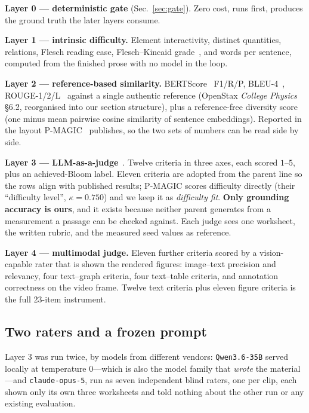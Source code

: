 \documentclass[conference]{IEEEtran}
\begin{document}
\textbf{Layer 0 --- deterministic gate} (Sec.~\ref{sec:gate}). Zero cost, runs
first, produces the ground truth the later layers consume.

\textbf{Layer 1 --- intrinsic difficulty.} Element interactivity, distinct
quantities, relations, Flesch reading ease, Flesch--Kincaid grade~\cite{fk}, and words
per sentence, computed from the finished prose with no model in the loop.

\textbf{Layer 2 --- reference-based similarity.} BERTScore~\cite{bertscore}
F1/R/P, BLEU-4~\cite{bleu}, ROUGE-1/2/L~\cite{rouge} against a single
authentic reference (OpenStax \emph{College Physics}~\cite{openstax} \S6.2, reorganised into our section structure), plus a
reference-free diversity score (one minus mean pairwise cosine similarity of
sentence embeddings). Reported in the layout P-MAGIC~\cite{pmagic} publishes, so
the two sets of numbers can be read side by side.

\textbf{Layer 3 --- LLM-as-a-judge}~\cite{mtbench,geval}. Twelve criteria in
three axes, each scored $1$--$5$, plus an achieved-Bloom label. Eleven criteria are adopted
from the parent line so the rows align with published results; P-MAGIC scores
difficulty directly (their ``difficulty level'', $\kappa = 0.750$) and we keep
it as \emph{difficulty fit}. \textbf{Only grounding accuracy is ours}, and it
exists because neither parent generates from a measurement a passage can be
checked against. Each judge sees one worksheet, the written
rubric, and the measured seed values as reference.

\textbf{Layer 4 --- multimodal judge.} Eleven further criteria scored by a
vision-capable rater that is shown the rendered figures: image--text precision
and relevancy, four text--graph criteria, four text--table criteria, and
annotation correctness on the video frame. Twelve text criteria plus eleven
figure criteria is the full 23-item instrument.

\subsection{Two raters and a frozen prompt}

Layer 3 was run twice, by models from different vendors:
\texttt{Qwen3.6-35B} served locally at temperature $0$---which is also the
model family that \emph{wrote} the material---and \texttt{claude-opus-5}, run
as seven independent blind raters, one per clip, each shown only its own three
worksheets and told nothing about the other run or any existing evaluation.
\end{document}
